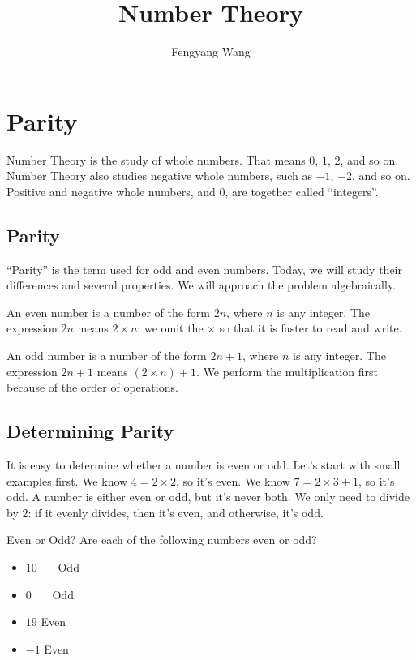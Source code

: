 \documentclass[a4paper,10pt]{report}
\title{Number Theory}
\author{Fengyang Wang}
\begin{document}
\maketitle

\chapter{Parity}

Number Theory is the study of whole numbers. That means $0$, $1$, $2$, and so
on. Number Theory also studies negative whole numbers, such as $-1$, $-2$, and
so on. Positive and negative whole numbers, and $0$, are together called
``integers''.

\section{Parity}

``Parity'' is the term used for odd and even numbers. Today, we will study their
differences and several properties. We will approach the problem algebraically.

An even number is a number of the form $2n$, where $n$ is any integer. The
expression $2n$ means $2\times n$; we omit the $\times$ so that it is faster to
read and write.

An odd number is a number of the form $2n+1$, where $n$ is any integer. The
expression $2n+1$ means $(2\times n) + 1$. We perform the multiplication first
because of the order of operations.

\section{Determining Parity}
It is easy to determine whether a number is even or odd. Let's start with small
examples first. We know $4=2\times2$, so it's even. We know $7=2\times3+1$, so
it's odd. A number is either even or odd, but it's never both. We only need to
divide by $2$: if it evenly divides, then it's even, and otherwise, it's odd.

\begin{problem}{Even or Odd?}
 Are each of the following numbers even or odd?

 \begin{itemize}
  \item $10$ \hfill {}~~~Odd
  \item $0$ \hfill {}~~~Odd
  \item $19$ \hfill Even~~~
  \item $-1$ \hfill Even~~~
 \end{itemize}
\end{problem}
\end{document}
